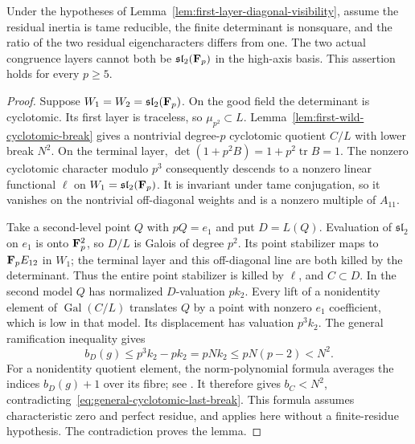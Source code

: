 \begin{lemma}\label{lem:traceless-first-wild-exclusion}
Under the hypotheses of Lemma~\ref{lem:first-layer-diagonal-visibility}, assume the residual inertia is tame reducible, the finite determinant is nonsquare, and the ratio of the two residual eigencharacters differs from one. The two actual congruence layers cannot both be $\mathfrak{sl}_2(\mathbf F_p)$ in the high-axis basis. This assertion holds for every $p\ge5$.
\end{lemma}
\begin{proof}
Suppose $W_1=W_2=\mathfrak{sl}_2(\mathbf F_p)$. On the good field the determinant is cyclotomic. Its first layer is traceless, so $\mu_{p^2}\subset L$. Lemma~\ref{lem:first-wild-cyclotomic-break} gives a nontrivial degree-$p$ cyclotomic quotient $C/L$ with lower break $N^2$.
On the terminal layer, $\det(1+p^2B)=1+p^2\operatorname{tr}B=1$. The nonzero cyclotomic character modulo $p^3$ consequently descends to a nonzero linear functional $\ell$ on $W_1=\mathfrak{sl}_2(\mathbf F_p)$. It is invariant under tame conjugation, so it vanishes on the nontrivial off-diagonal weights and is a nonzero multiple of $A_{11}$.

Take a second-level point $Q$ with $pQ=e_1$ and put $D=L(Q)$. Evaluation of $\mathfrak{sl}_2$ on $e_1$ is onto $\mathbf F_p^2$, so $D/L$ is Galois of degree $p^2$. Its point stabilizer maps to $\mathbf F_pE_{12}$ in $W_1$; the terminal layer and this off-diagonal line are both killed by the determinant. Thus the entire point stabilizer is killed by $\ell$, and $C\subset D$. In the second model $Q$ has normalized $D$-valuation $pk_2$. Every lift of a nonidentity element of $\operatorname{Gal}(C/L)$ translates $Q$ by a point with nonzero $e_1$ coefficient, which is low in that model. Its displacement has valuation $p^3k_2$. The general ramification inequality gives
\[
          b_D(g)\le p^3k_2-pk_2=pNk_2\le pN(p-2)<N^2.
\]
For a nonidentity quotient element, the norm-polynomial formula averages the indices $b_D(g)+1$ over its fibre; see \citet[Proposition~3.7 and its full proof, pp.~14--15]{ColmezLocal}. It therefore gives $b_C<N^2$, contradicting~\eqref{eq:general-cyclotomic-last-break}. This formula assumes characteristic zero and perfect residue, and applies here without a finite-residue hypothesis.
The contradiction proves the lemma.
\end{proof}

